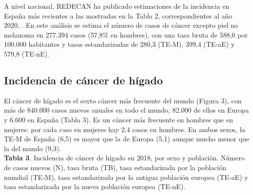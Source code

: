 A nivel nacional, REDECAN ha publicado estimaciones de la incidencia en España más recientes a las mostradas en la Tabla 2, correspondientes al año 2020, \cite{REDECAN2020}. En este análisis se estima el número de casos de cáncer excepto piel no melanoma en 277.394 casos (57,8\% en hombres), con una tasa bruta de 588,0 por 100.000 habitantes y tasas estandarizadas de 280,3 (TE-M), 399,4 (TE-aE) y 579,8 (TE-nE).

\subsection{Incidencia de cáncer de hígado}

El cáncer de hígado es el sexto cáncer más frecuente del mundo (Figura 3), con más de 840.000 casos nuevos anuales en todo el mundo, 82.000 de ellos en Europa y 6.600 en España (Tabla 3). Es un cáncer más frecuente en hombres que en mujeres: por cada caso en mujeres hay 2,4 casos en hombres. En ambos sexos, la TE-M de España (6,5) es mayor que la de Europa (5,1) aunque mucho menor que la del mundo (9,3).\\

\newpage
\textbf{Tabla 3}. Incidencia de cáncer de hígado en 2018, por sexo y población. Número de casos nuevos (N), tasa bruta (TB), tasa estandarizada por la población mundial (TE-M),  tasa estandarizada por la antigua población europea (TE-aE) y  tasa estandarizada por la nueva población europea (TE-nE).

